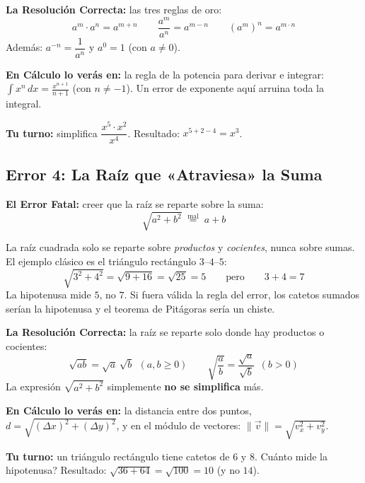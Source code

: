 \documentclass[12pt, letterpaper]{article}
\begin{document}
\begin{cuadrosolucion}
  \textbf{La Resolución Correcta:} las tres reglas de oro:
  \[
    a^m \cdot a^n = a^{m+n} \qquad \frac{a^m}{a^n} = a^{m-n} \qquad (a^m)^n = a^{m \cdot n}
  \]
  Además: $a^{-n} = \dfrac{1}{a^n}$ y $a^0 = 1$ (con $a \neq 0$).
\end{cuadrosolucion}

\noindent\textbf{En Cálculo lo verás en:} la regla de la potencia para derivar e integrar: $\int x^n \, dx = \frac{x^{n+1}}{n+1}$ (con $n \neq -1$). Un error de exponente aquí arruina toda la integral.

\noindent\textbf{Tu turno:} simplifica $\dfrac{x^5 \cdot x^2}{x^4}$. Resultado: $x^{5+2-4} = x^3$.

\subsection{Error 4: La Raíz que «Atraviesa» la Suma}

\begin{cuadroadvertencia}
  \textbf{El Error Fatal:} creer que la raíz se reparte sobre la suma:
  \[
    \sqrt{a^2 + b^2} \;\overset{\text{mal}}{=}\; a + b
  \]
\end{cuadroadvertencia}

La raíz cuadrada solo se reparte sobre \emph{productos} y \emph{cocientes}, nunca sobre sumas. El ejemplo clásico es el triángulo rectángulo $3$–$4$–$5$:
\[
  \sqrt{3^2 + 4^2} = \sqrt{9 + 16} = \sqrt{25} = 5 \qquad \text{pero} \qquad 3 + 4 = 7
\]
La hipotenusa mide $5$, no $7$. Si fuera válida la regla del error, los catetos sumados serían la hipotenusa y el teorema de Pitágoras sería un chiste.

\begin{cuadrosolucion}
  \textbf{La Resolución Correcta:} la raíz se reparte solo donde hay productos o cocientes:
  \[
    \sqrt{ab} = \sqrt{a}\,\sqrt{b} \ \ (a, b \geq 0) \qquad
    \sqrt{\frac{a}{b}} = \frac{\sqrt{a}}{\sqrt{b}} \ \ (b > 0)
  \]
  La expresión $\sqrt{a^2 + b^2}$ simplemente \textbf{no se simplifica} más.
\end{cuadrosolucion}

\noindent\textbf{En Cálculo lo verás en:} la distancia entre dos puntos, $d = \sqrt{(\Delta x)^2 + (\Delta y)^2}$, y en el módulo de vectores: $\|\vec{v}\| = \sqrt{v_x^2 + v_y^2}$.

\noindent\textbf{Tu turno:} un triángulo rectángulo tiene catetos de $6$ y $8$. \textquestiondown Cuánto mide la hipotenusa? Resultado: $\sqrt{36 + 64} = \sqrt{100} = 10$ (y no $14$).
\end{document}
